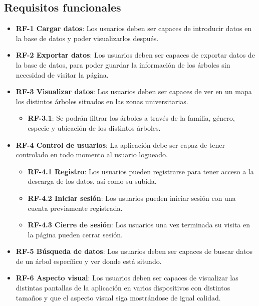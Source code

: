	\subsection{Requisitos funcionales}
		\begin{itemize}
			\item \textbf{RF-1 Cargar datos}: Los usuarios deben ser capaces de introducir datos en la base de datos y poder visualizarlos después.
			\item \textbf{RF-2 Exportar datos}: Los usuarios deben ser capaces de exportar datos de la base de datos, para poder guardar la información de los árboles sin necesidad de visitar la página.
			\item \textbf{RF-3 Visualizar datos}: Los usuarios deben ser capaces de ver en un mapa los distintos árboles situados en las zonas universitarias.
			\begin{itemize}
				\item \textbf{RF-3.1}: Se podrán filtrar los árboles a través de la familia, género, especie y ubicación de los distintos árboles.
			\end{itemize}
			\item \textbf{RF-4 Control de usuarios}: La aplicación debe ser capaz de tener controlado en todo momento al usuario logueado.
			\begin{itemize}
				\item \textbf{RF-4.1 Registro}: Los usuarios pueden registrarse para tener acceso a la descarga de los datos, así como su subida.
				\item \textbf{RF-4.2 Iniciar sesión}: Los usuarios pueden iniciar sesión con una cuenta previamente registrada.
				\item \textbf{RF-4.3 Cierre de sesión}: Los usuarios una vez terminada su visita en la página pueden cerrar sesión. 
			\end{itemize}
			\item \textbf{RF-5 Búsqueda de datos}: Los usuarios deben ser capaces de buscar datos de un árbol específico y ver donde está situado.
			\item \textbf{RF-6 Aspecto visual}: Los usuarios deben ser capaces de visualizar las distintas pantallas de la aplicación en varios dispositivos con distintos tamaños y que el aspecto visual siga mostrándose de igual calidad. 
		\end{itemize}

